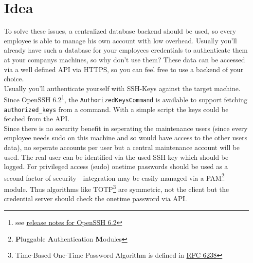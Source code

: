 %
%
%
%
%
%
%


\section{Idea}

To solve these issues, a centralized database backend should be used, so every
employee is able to manage his own account with low overhead. Usually you'll
already have such a database for your employees credentials to authenticate them
at your companys machines, so why don't use them? These data can be accessed via
a well defined API via HTTPS, so you can feel free to use a backend of your
choice. \\

Usually you'll authenticate yourself with SSH-Keys against the target machine.
Since OpenSSH 6.2\footnote{see
\href{http://www.openssh.com/txt/release-6.2}{release notes for OpenSSH 6.2}},
the \verb+AuthorizedKeysCommand+ is available to support fetching
\verb+authorized_keys+ from a command. With a simple script the keys could be
fetched from the API. \\

Since there is no security benefit in seperating the
maintenance users (since every employee needs sudo on this machine and so would
have access to the other users data), no seperate accounts per user but a
central maintenance account will be used. The real user can be identified via
the used SSH key which should be logged. For privileged access (sudo) onetime
passwords should be used as a second factor of security - integration may be
easily managed via a PAM\footnote{\textbf{P}luggable \textbf{A}uthentication
\textbf{M}odules} module. Thus algorithms like TOTP\footnote{Time-Based One-Time
Password Algorithm is defined in
\href{https://tools.ietf.org/html/rfc6238}{RFC 6238}} are symmetric, not the
client but the credential server should check the onetime password via API. \\


